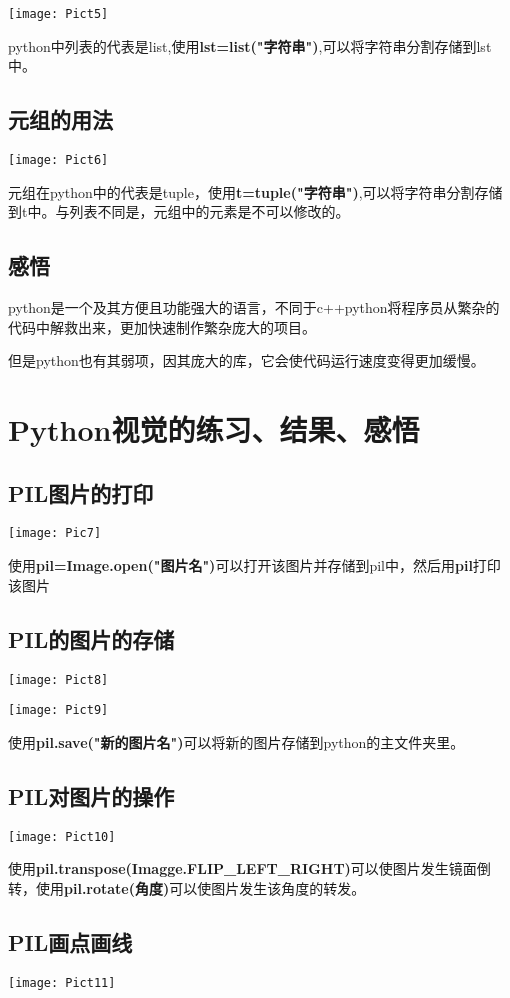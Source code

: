 \documentclass[a4paper, 12pt]{article}
\begin{document}
\texttt{[image: Pict5]}

python中列表的代表是list,使用\textbf{lst=list("字符串")},可以将字符串分割存储到lst中。
\subsection{\small 元组的用法}
\texttt{[image: Pict6]}

元组在python中的代表是tuple，使用\textbf{t=tuple("字符串")},可以将字符串分割存储到t中。与列表不同是，元组中的元素是不可以修改的。

\subsection{\small 感悟}

python是一个及其方便且功能强大的语言，不同于c++python将程序员从繁杂的代码中解救出来，更加快速制作繁杂庞大的项目。

但是python也有其弱项，因其庞大的库，它会使代码运行速度变得更加缓慢。
\section{\large Python视觉的练习、结果、感悟}
\subsection{\small PIL图片的打印}
\texttt{[image: Pic7]}

使用\textbf{pil=Image.open("图片名")}可以打开该图片并存储到pil中，然后用\textbf{pil}打印该图片
\subsection{\small PIL的图片的存储}
\texttt{[image: Pict8]}

\texttt{[image: Pict9]}

使用\textbf{pil.save("新的图片名")}可以将新的图片存储到python的主文件夹里。
\subsection{\small PIL对图片的操作}
\texttt{[image: Pict10]}

使用\textbf{pil.transpose(Imagge.FLIP\_LEFT\_RIGHT)}可以使图片发生镜面倒转，使用\textbf{pil.rotate(角度)}可以使图片发生该角度的转发。
\subsection{\small PIL画点画线}
\texttt{[image: Pict11]}
\end{document}
